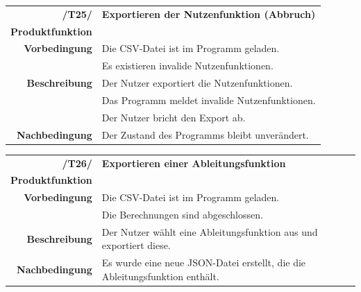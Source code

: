 \documentclass{article}
\begin{document}
\begin{table}[H]
\begin{tabularx}{\textwidth}{rX}
\vspace{1mm}
\textbf{/T25/}         & \textbf{Exportieren der Nutzenfunktion (Abbruch)} \\ \vspace{1mm}
\textbf{Produktfunktion} & \nameref{sec:f:Alternativen exportieren} \\
\textbf{Vorbedingung}  & Die CSV-Datei ist im Programm geladen. \\  \vspace{1mm}& Es existieren invalide Nutzenfunktionen. \\
\textbf{Beschreibung}  & Der Nutzer exportiert die Nutzenfunktionen. \\ & Das Programm meldet invalide Nutzenfunktionen. \\ \vspace{1mm} & Der Nutzer bricht den Export ab. \\
\textbf{Nachbedingung} & Der Zustand des Programms bleibt unverändert.
\end{tabularx}
\end{table}

\begin{table}[H]
\begin{tabularx}{\textwidth}{rX} \vspace{1mm}
\textbf{/T26/}         & \textbf{Exportieren einer Ableitungsfunktion}  \\ \vspace{1mm}
\textbf{Produktfunktion} & \nameref{sec:f:Attributsableitungen exportieren} \\
\textbf{Vorbedingung}  & Die CSV-Datei ist im Programm geladen. \\ \vspace{1mm} & Die Berechnungen sind abgeschlossen.   \\ \vspace{1mm}
\textbf{Beschreibung}  & Der Nutzer wählt eine Ableitungsfunktion aus und exportiert diese. \\
\textbf{Nachbedingung} & Es wurde eine neue JSON-Datei erstellt, die die Ableitungsfunktion enthält.
\end{tabularx}
\end{table}
\end{document}
